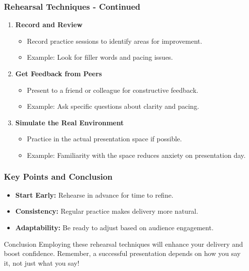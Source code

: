 \documentclass[aspectratio=169]{beamer}
\begin{document}
\begin{frame}[fragile]
    \frametitle{Rehearsal Techniques - Continued}
    \begin{enumerate}[resume]
        \item \textbf{Record and Review}
        \begin{itemize}
            \item Record practice sessions to identify areas for improvement.
            \item Example: Look for filler words and pacing issues.
        \end{itemize}
        
        \item \textbf{Get Feedback from Peers}
        \begin{itemize}
            \item Present to a friend or colleague for constructive feedback.
            \item Example: Ask specific questions about clarity and pacing.
        \end{itemize}
        
        \item \textbf{Simulate the Real Environment}
        \begin{itemize}
            \item Practice in the actual presentation space if possible.
            \item Example: Familiarity with the space reduces anxiety on presentation day.
        \end{itemize}
    \end{enumerate}
\end{frame}

\begin{frame}[fragile]
    \frametitle{Key Points and Conclusion}
    \begin{itemize}
        \item \textbf{Start Early:} Rehearse in advance for time to refine.
        \item \textbf{Consistency:} Regular practice makes delivery more natural.
        \item \textbf{Adaptability:} Be ready to adjust based on audience engagement.
    \end{itemize}
    
    \begin{block}{Conclusion}
        Employing these rehearsal techniques will enhance your delivery and boost confidence. 
        Remember, a successful presentation depends on how you say it, not just what you say!
    \end{block}
\end{frame}
\end{document}
